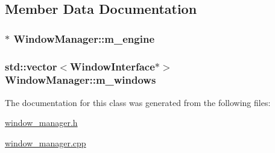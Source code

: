 \subsection{Member Data Documentation}
\hypertarget{classWindowManager_ae1fb8500f2391518ba8c7b2cfb6f30f7}{
\subsubsection[{m\-\_\-engine}]{$\ast$ Window\-Manager\-::m\-\_\-engine\hspace{0.3cm}{\ttfamily [private]}}}\label{classWindowManager_ae1fb8500f2391518ba8c7b2cfb6f30f7}
\hypertarget{classWindowManager_ad3b8bc0fa911812f00a871c195944c65}{
\subsubsection[{m\-\_\-windows}]{\setlength{\rightskip}{0pt plus 5cm}std\-::vector$<${\bf Window\-Interface}$\ast$$>$ Window\-Manager\-::m\-\_\-windows\hspace{0.3cm}{\ttfamily [private]}}}\label{classWindowManager_ad3b8bc0fa911812f00a871c195944c65}


The documentation for this class was generated from the following files\-:\begin{DoxyCompactItemize}
\item 
\hyperlink{window__manager_8h}{window\-\_\-manager.\-h}\item 
\hyperlink{window__manager_8cpp}{window\-\_\-manager.\-cpp}\end{DoxyCompactItemize}

